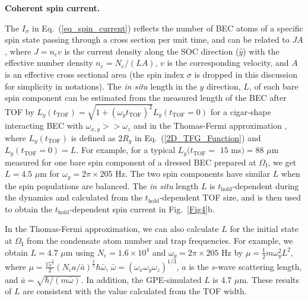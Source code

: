 \documentclass[showpacs,preprintnumbers,amsmath,amssymb, superscriptaddress, aps, reprint]{revtex4-1}
\def\OmegaI{\Omega_{\text{I}}}
\def\thold{t_{\text{hold}}}
\begin{document}
{{{\vspace{5mm}

\textbf{Coherent spin current.} 

The $I_{\sigma}$ in Eq.~(\ref{eq_spin_current}) reflects the number of BEC atoms of a specific spin state passing through a cross section per unit time, and can be related to $JA$, where $J=n_{\text{c}}v$ is the current density along the SOC direction ($\hat{y}$) with the effective number density $n_{\text{c}} = {N_{\text{c}}}/\left( {LA} \right)$, $v$ is the corresponding velocity, and $A$ is an effective cross sectional area (the spin index $\sigma$ is dropped in this discussion for simplicity in notations). The \textit{in situ} length in the $y$ direction, $L$, of each bare spin component can be estimated from the measured length of the BEC after TOF by ${L_y}\left( {{t_{\text{TOF}}}} \right) =\sqrt {1+(\omega_y t_{\text{TOF}})^2}{L_y}\left( {{t_{\text{TOF}}} = 0} \right)$ for a cigar-shape interacting BEC with $\omega_{x,y}>>\omega_z$ and in the Thomas-Fermi approximation \cite{Castin_PRL1996}, where ${L_y}\left( {{t_{\text{TOF}}}} \right)$ is defined as $2R_y$ in Eq.~(\ref{2D_TFG_Function}) and ${L_y}\left( {{t_{\text{TOF}}} = 0} \right) = L$. For example, for a typical ${L_y}( {{t_{\text{TOF}}} = }$ $15$ ms$)=88$ $\mu$m measured for one bare spin component of a dressed BEC prepared at $\OmegaI$, we get $L=4.5$ $\mu$m for ${\omega _y}= 2\pi\times 205$ Hz. The two spin components have similar $L$ when the spin populations are balanced. The \textit{in situ} length $L$ is $\thold$-dependent during the dynamics and calculated from the $\thold$-dependent TOF size, and is then used to obtain the $\thold$-dependent spin current in Fig.~\ref{Fig4}b.

In the Thomas-Fermi approximation, we can also calculate $L$ for the initial state at $\OmegaI$ from the condensate atom number and trap frequencies. For example, we obtain $L = 4.7$ $\mu$m using $N_{\text{c}}=1.6\times 10^4$ and ${\omega _y}= 2\pi\times 205$ Hz by $\mu=\frac{1}{2}m\omega _y^2L^2$, where $\mu  = \frac{15^{\frac{2}{5}}}{2}(N_{\text{c}} a/\bar a)^{\frac{2}{5}}\hbar \bar \omega$, $\bar \omega  = {({\omega _x}{\omega _y}{\omega _z})^{1/3}}$, $a$ is the $s$-wave scattering length, and $\bar a = \sqrt{\hbar /(m\bar \omega )}$. In addition, the GPE-simulated $L$ is 4.7 $\mu$m. These results of $L$ are consistent with the value calculated from the TOF width.



\vspace{5mm}

}}}
\end{document}

